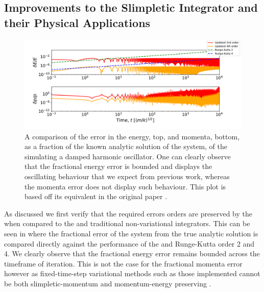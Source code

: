 \subsection{Improvements to the Slimpletic Integrator and their Physical Applications}
\label{sec:results-si}

\begin{figure}[t]
  \includegraphics[width=\columnwidth]{figures/dho_energy_momenta_fractional_err.pdf}
  \caption{A comparison of the error in the energy, top, and momenta, bottom, as a fraction of the known analytic solution of the system, of the \updimpl{} simulating a damped harmonic oscillator. One can clearly observe that the fractional energy error is bounded and displays the oscillating behaviour that we expect from previous work, whereas the momenta error does not display such behaviour. This plot is based off its equivalent in the original paper \cite[Figure 2, bottom]{tsangSLIMPLECTICINTEGRATORSVARIATIONAL2015}.}
\label{fig:dho_energy_bounds}
\end{figure}

As discussed we first verify that the required errors orders are preserved by the \updimpl{} when compared to the \orgimpl{} and traditional non-variational integrators. This can be seen in  where the fractional error of the system from the true analytic solution is compared directly against the performance of the \orgimpl{} and Runge-Kutta order 2 and 4. We clearly observe that the fractional energy error remains bounded across the timeframe of iteration. This is not the case for the fractional momenta error however as fixed-time-step variational methods such as those implemented cannot be both slimpletic-momentum and momentum-energy preserving \cite{zhongLiePoissonHamiltonJacobiTheory1988}.

